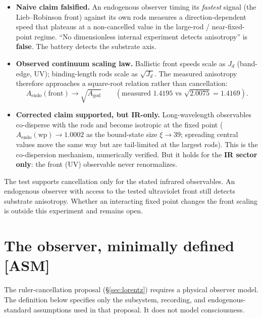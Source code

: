 \documentclass[11pt]{article}
\newcommand{\asm}{\textcolor{blue!70!black}{\textsf{\small[ASM]}}}
\def\quad{ }\def\normalsize{}%
\theoremstyle{definition}
\theoremstyle{remark}
\begin{document}
\begin{itemize}[leftmargin=1.4em, itemsep=3pt, topsep=3pt]
  \item \textbf{Naive claim falsified.} An endogenous observer timing its \emph{fastest} signal (the Lieb--Robinson front) against its own rods measures a direction-dependent speed that plateaus at a non-cancelled value in the large-rod / near-fixed-point regime. ``No dimensionless internal experiment detects anisotropy'' is \textbf{false}. The battery detects the substrate axis.
  \item \textbf{Observed continuum scaling law.} Ballistic front speeds scale as $J_d$ (band-edge, UV); binding-length rods scale as $\sqrt{J_d}$. The measured anisotropy therefore approaches a square-root relation rather than cancellation:
  \[
    A_{\text{endo}}(\text{front}) \to \sqrt{A_{\text{god}}}
    \qquad(\text{measured } 1.4195 \text{ vs } \sqrt{2.0075}=1.4169).
  \]
  \item \textbf{Corrected claim supported, but IR-only.} Long-wavelength observables co-disperse with the rods and become isotropic at the fixed point ($A_{\text{endo}}(\text{wp})\to 1.0002$ as the bound-state size $\xi\to 39$; spreading central values move the same way but are tail-limited at the largest rods). This is the co-dispersion mechanism, numerically verified. But it holds for the \textbf{IR sector only}: the front (UV) observable never renormalizes.
\end{itemize}

\noindent The test supports cancellation only for the stated infrared observables. An endogenous observer with access to the tested ultraviolet front still detects substrate anisotropy. Whether an interacting fixed point changes the front scaling is outside this experiment and remains open.

\section{The observer, minimally defined \quad{\normalsize\asm}\label{sec:observer}}

The ruler-cancellation proposal (\S\ref{sec:lorentz}) requires a physical observer model. The definition below specifies only the subsystem, recording, and endogenous-standard assumptions used in that proposal. It does not model consciousness.
\end{document}
